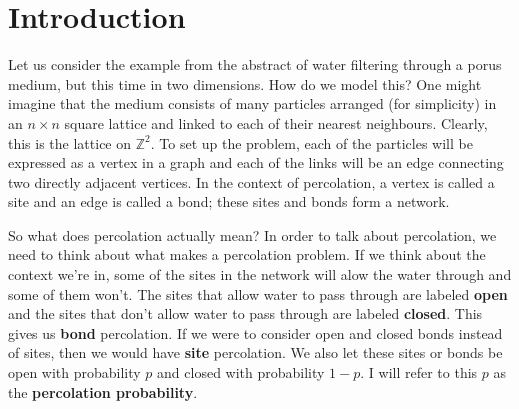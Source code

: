 \section{Introduction}
Let us consider the example from the abstract of water filtering through a porus medium, but this time in two dimensions. How do we model this? One might imagine that the medium consists of
many particles arranged (for simplicity) in an $n \times n$ square lattice and linked to each of their nearest neighbours. Clearly, this is the lattice on $\mathbb{Z}^2$.
To set up the problem, each of the particles will be expressed as a vertex in a graph and each of the links will be an edge connecting two directly adjacent vertices. In the context of percolation, a vertex is called a site and an edge is
called a bond; these sites and bonds form a network.




So what does percolation actually mean? In order to talk about percolation, we need to think about what makes a percolation problem. If we think about the context we're in, some of
the sites in the network will alow the water through and some of them won't. The sites that allow water to pass through are labeled \textbf{open} and the sites that don't allow
water to pass through are labeled \textbf{closed}. This gives us \textbf{bond} percolation. If we were to consider open and closed bonds instead of sites, then we would have
\textbf{site} percolation. We also let these sites or bonds be open with probability $p$ and closed with probability $1-p$. I will refer to this $p$ as the \textbf{percolation
probability}.


